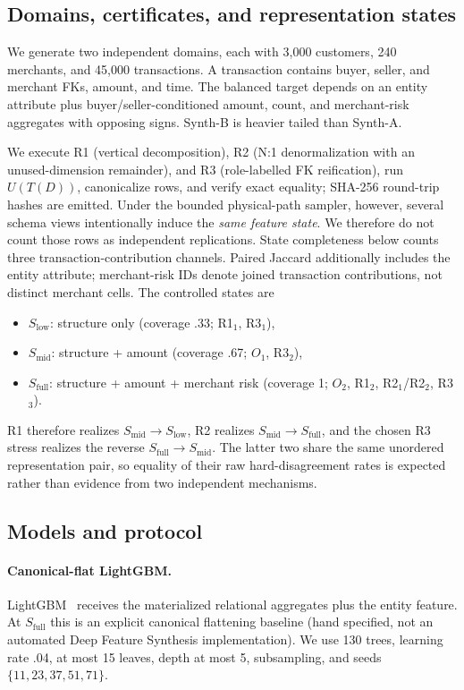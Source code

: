 \documentclass[runningheads]{llncs}
\begin{document}
\subsection{Domains, certificates, and representation states}
We generate two independent domains, each with 3,000 customers, 240 merchants, and 45,000 transactions. A transaction contains buyer, seller, and merchant FKs, amount, and time. The balanced target depends on an entity attribute plus buyer/seller-conditioned amount, count, and merchant-risk aggregates with opposing signs. Synth-B is heavier tailed than Synth-A.

We execute R1 (vertical decomposition), R2 (N:1 denormalization with an unused-dimension remainder), and R3 (role-labelled FK reification), run $U(T(D))$, canonicalize rows, and verify exact equality; SHA-256 round-trip hashes are emitted. Under the bounded physical-path sampler, however, several schema views intentionally induce the \emph{same feature state}. We therefore do not count those rows as independent replications. State completeness below counts three transaction-contribution channels. Paired Jaccard additionally includes the entity attribute; merchant-risk IDs denote joined transaction contributions, not distinct merchant cells. The controlled states are
\begin{itemize}
    \item $S_{\mathrm{low}}$: structure only (coverage .33; R1$_1$, R3$_1$),
    \item $S_{\mathrm{mid}}$: structure + amount (coverage .67; $O_1$, R3$_2$),
    \item $S_{\mathrm{full}}$: structure + amount + merchant risk (coverage 1; $O_2$, R1$_2$, R2$_1$/R2$_2$, R3$_3$).
\end{itemize}
R1 therefore realizes $S_{\mathrm{mid}}\!\to S_{\mathrm{low}}$, R2 realizes $S_{\mathrm{mid}}\!\to S_{\mathrm{full}}$, and the chosen R3 stress realizes the reverse $S_{\mathrm{full}}\!\to S_{\mathrm{mid}}$. The latter two share the same unordered representation pair, so equality of their raw hard-disagreement rates is expected rather than evidence from two independent mechanisms.

\subsection{Models and protocol}
\paragraph{Canonical-flat LightGBM.} LightGBM~\cite{ke2017lightgbm} receives the materialized relational aggregates plus the entity feature. At $S_{\mathrm{full}}$ this is an explicit canonical flattening baseline (hand specified, not an automated Deep Feature Synthesis implementation). We use 130 trees, learning rate .04, at most 15 leaves, depth at most 5, subsampling, and seeds $\{11,23,37,51,71\}$.
\end{document}
